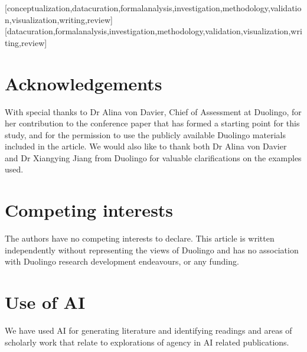 \documentclass[english]{textolivre}
\begin{document}
\printbibliography\label{sec-bib}


\begin{contributors}
[conceptualization,datacuration,formalanalysis,investigation,methodology,validation,visualization,writing,review]
[datacuration,formalanalysis,investigation,methodology,validation,visualization,writing,review]
\end{contributors}

\section*{\fontsize{10}{12}\selectfont Acknowledgements}
With special thanks to Dr Alina von Davier, Chief of Assessment at Duolingo, for her contribution to the conference paper \cite{vondavier2025designing} that has formed a starting point for this study, and for the permission to use the publicly available Duolingo materials included in the article. We would also like to thank both Dr Alina von Davier and Dr Xiangying Jiang from Duolingo for valuable clarifications on the examples used.

\section*{\fontsize{10}{12}\selectfont Competing interests}
The authors have no competing interests to declare. This article is written independently without representing the views of Duolingo and has no association with Duolingo research development endeavours, or any funding.

\section*{\fontsize{10}{12}\selectfont Use of AI}
We have used AI for generating literature and identifying readings and areas of scholarly work that relate to explorations of agency in AI related publications.

\begin{dataavailability}
\end{dataavailability}
\end{document}
